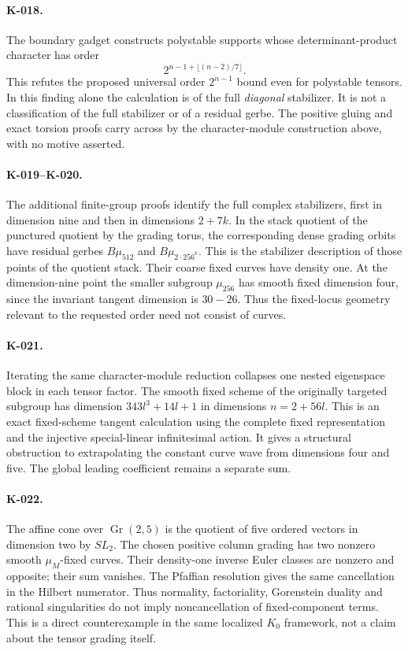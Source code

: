 \paragraph{K-018.}
The boundary gadget constructs polystable supports whose
determinant-product character has order
\[
             2^{n-1+\lfloor(n-2)/7\rfloor}.
\]
This refutes the proposed universal order $2^{n-1}$ bound even
for polystable tensors.  In this finding alone the calculation
is of the full \emph{diagonal} stabilizer.  It is not a
classification of the full stabilizer or of a residual gerbe.
The positive gluing and exact torsion proofs carry across by
the character-module construction above, with no motive asserted.

\paragraph{K-019--K-020.}
The additional finite-group proofs identify the full complex
stabilizers, first in dimension nine and then in dimensions
$2+7k$.  In the stack quotient of the punctured quotient by
the grading torus, the corresponding dense grading orbits have
residual gerbes $B\mu_{512}$ and $B\mu_{2\cdot256^k}$.
This is the stabilizer description of those points of the
quotient stack.  Their coarse fixed curves have density one.
At the dimension-nine point the smaller subgroup $\mu_{256}$
has smooth fixed dimension four, since the invariant tangent
dimension is $30-26$.  Thus the fixed-locus geometry relevant
to the requested order need not consist of curves.

\paragraph{K-021.}
Iterating the same character-module reduction collapses one
nested eigenspace block in each tensor factor.  The smooth
fixed scheme of the originally targeted subgroup has dimension
$343l^3+14l+1$ in dimensions $n=2+56l$.  This is an exact
fixed-scheme tangent calculation using the complete fixed
representation and the injective special-linear infinitesimal
action.  It gives a structural obstruction to extrapolating
the constant curve wave from dimensions four and five.
The global leading coefficient remains a separate sum.

\paragraph{K-022.}
The affine cone over $\operatorname{Gr}(2,5)$ is the quotient
of five ordered vectors in dimension two by $SL_2$.
The chosen positive column grading has two nonzero smooth
$\mu_M$-fixed curves. Their density-one inverse Euler classes
are nonzero and opposite; their sum vanishes. The Pfaffian
resolution gives the same cancellation in the Hilbert numerator.
Thus normality, factoriality, Gorenstein duality and rational
singularities do not imply noncancellation of fixed-component
terms. This is a direct counterexample in the same localized
$K_0$ framework, not a claim about the tensor grading itself.

